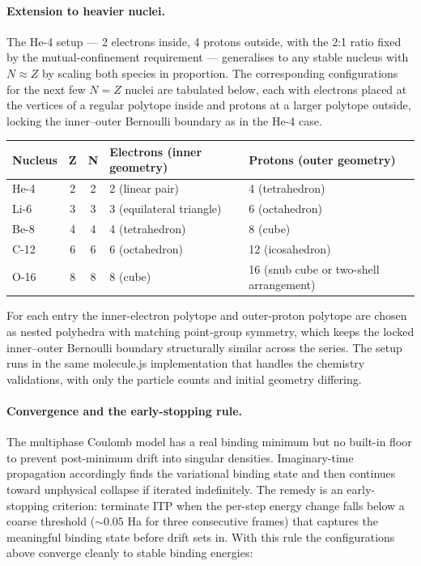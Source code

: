\documentclass[11pt]{article}
\begin{document}
\paragraph{Extension to heavier nuclei.}
The He-4 setup --- 2 electrons inside, 4 protons outside, with the 2:1 ratio fixed by the mutual-confinement requirement --- generalises to any stable nucleus with $N \approx Z$ by scaling both species in proportion. The corresponding configurations for the next few $N{=}Z$ nuclei are tabulated below, each with electrons placed at the vertices of a regular polytope inside and protons at a larger polytope outside, locking the inner--outer Bernoulli boundary as in the He-4 case.

\begin{center}
\begin{tabular}{lccll}
\hline
\textbf{Nucleus} & \textbf{Z} & \textbf{N} & \textbf{Electrons (inner geometry)} & \textbf{Protons (outer geometry)} \\
\hline
He-4  & 2 & 2 & 2 (linear pair)        & 4 (tetrahedron) \\
Li-6  & 3 & 3 & 3 (equilateral triangle) & 6 (octahedron)  \\
Be-8  & 4 & 4 & 4 (tetrahedron)         & 8 (cube)        \\
C-12  & 6 & 6 & 6 (octahedron)          & 12 (icosahedron) \\
O-16  & 8 & 8 & 8 (cube)                & 16 (snub cube or two-shell arrangement) \\
\hline
\end{tabular}
\end{center}

For each entry the inner-electron polytope and outer-proton polytope are chosen as nested polyhedra with matching point-group symmetry, which keeps the locked inner--outer Bernoulli boundary structurally similar across the series. The setup runs in the same molecule.js implementation that handles the chemistry validations, with only the particle counts and initial geometry differing.

\paragraph{Convergence and the early-stopping rule.}
The multiphase Coulomb model has a real binding minimum but no built-in floor to prevent post-minimum drift into singular densities. Imaginary-time propagation accordingly finds the variational binding state and then continues toward unphysical collapse if iterated indefinitely. The remedy is an early-stopping criterion: terminate ITP when the per-step energy change falls below a coarse threshold ($\sim 0.05$ Ha for three consecutive frames) that captures the meaningful binding state before drift sets in. With this rule the configurations above converge cleanly to stable binding energies:
\end{document}

